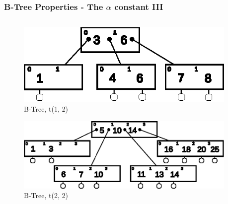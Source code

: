 \documentclass{beamer}
\begin{document}
\begin{frame}
    \frametitle{B-Tree Properties - The \(\alpha\) constant III}
    \begin{columns}
        \begin{column}{\textwidth}
            \begin{block}{}
                \begin{figure}
                    \centering
                    \includegraphics[width=0.65\linewidth,keepaspectratio]{resources/made/a2_btree.eps}
                    \caption[]{B-Tree, t(1, 2)}
                \end{figure}
                \vspace{-0.75cm}
                \begin{figure}
                    \centering
                    \includegraphics[width=0.75\linewidth,keepaspectratio]{resources/made/a3_btree.eps}
                    \caption[]{B-Tree, t(2, 2)}
                \end{figure}
            \end{block}    
        \end{column}
        \begin{column}{0pt}
        \end{column}
    \end{columns}
\end{frame}
\end{document}
